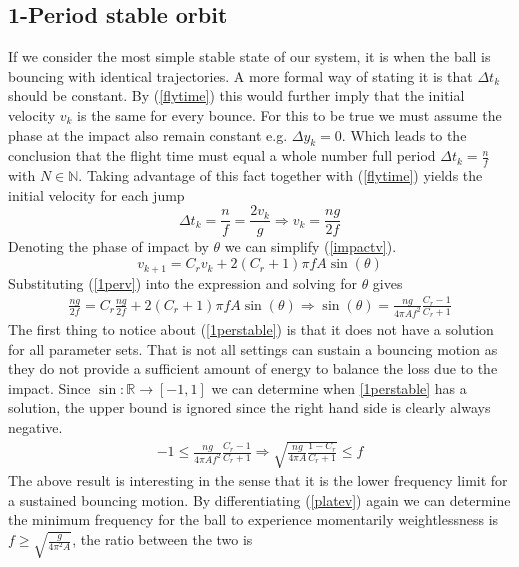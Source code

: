 \documentclass[12pt,oneside,a4paper]{article}
\numberwithin{equation}{section}
\begin{document}
{{{{\subsection{1-Period stable orbit}
If we consider the most simple stable state of our system, it is when the ball is bouncing with identical trajectories. A more formal way of stating it is that $\Delta t_k$ should be constant. By  (\ref{flytime}) this would further imply that the initial velocity $v_k$ is the same for every bounce. For this to be true we must assume the phase at the impact also remain constant e.g. $\Delta y_k=0$. Which leads to the conclusion that the flight time must equal a whole number full period $\Delta t_k = \frac{n}{f}$ with $N\in \mathbb{N}$. Taking advantage of this fact together with (\ref{flytime}) yields the initial velocity for each jump
\begin{equation}
	\Delta t_k = \frac{n}{f} = \frac{2v_k}{g} \Rightarrow v_k = \frac{ng}{2f}
	\label{1perv}
\end{equation}
Denoting the phase of impact by $\theta$ we can simplify (\ref{impactv}).
\begin{equation}
	v_{k+1} = C_rv_k+2(C_r+1)\pi fA \sin(\theta)
\end{equation}
Substituting (\ref{1perv}) into the expression and solving for $\theta$ gives
\begin{align}
	\frac{ng}{2f} = C_r\frac{ng}{2f}+2(C_r+1)\pi fA \sin(\theta) \Rightarrow \sin(\theta) = \frac{ng}{4\pi Af^2 }\frac{C_r-1}{C_r+1}
	\label{1perstable}
\end{align}
The first thing to notice about (\ref{1perstable}) is that it does not have a solution for all parameter sets. That is not all settings can sustain a bouncing motion as they do not provide a sufficient amount of energy to balance the loss due to the impact. Since $\sin: \mathbb{R} \rightarrow [-1,1]$ we can determine when \eqref{1perstable} has a solution, the upper bound is ignored since the right hand side is clearly always negative.
\begin{align}
	-1 \le \frac{ng}{4\pi Af^2 }\frac{C_r-1}{C_r+1} \Rightarrow \sqrt{\frac{ng}{4\pi A}\frac{1-C_r}{C_r+1}} \le f
\end{align}
The above result is interesting in the sense that it is the lower frequency limit for a sustained bouncing motion. By differentiating (\ref{platev}) again we can determine the minimum frequency for the ball to experience momentarily weightlessness is $f\ge\sqrt{\frac{g}{4\pi^2A}}$, the ratio between the two is
\begin{equation}

\end{equation}}}}}
\end{document}
